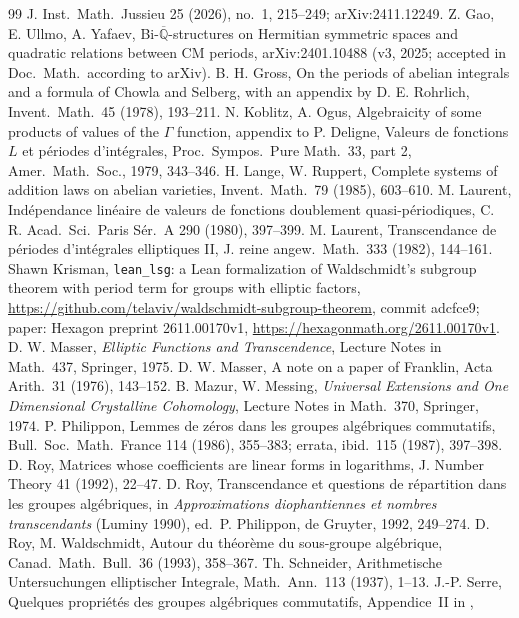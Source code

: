 \documentclass[11pt]{amsart}
\theoremstyle{definition}
\newcommand{\Qb}{\overline{\mathbb{Q}}}
\begin{document}
\begin{thebibliography}{99}
J. Inst.\ Math.\ Jussieu 25 (2026), no.~1, 215--249; arXiv:2411.12249.
 Z. Gao, E. Ullmo, A. Yafaev, Bi-$\Qb$-structures on Hermitian symmetric spaces and quadratic relations
between CM periods, arXiv:2401.10488 (v3, 2025; accepted in Doc.\ Math.\ according to arXiv).
 B. H. Gross, On the periods of abelian integrals and a formula of Chowla and Selberg, with an appendix by
D. E. Rohrlich, Invent.\ Math.\ 45 (1978), 193--211.
 N. Koblitz, A. Ogus, Algebraicity of some products of values of the $\Gamma$ function, appendix to P. Deligne,
Valeurs de fonctions $L$ et p\'eriodes d'int\'egrales, Proc.\ Sympos.\ Pure Math.\ 33, part 2, Amer.\ Math.\ Soc., 1979,
343--346.
 H. Lange, W. Ruppert, Complete systems of addition laws on abelian varieties, Invent.\ Math.\ 79
(1985), 603--610.
 M. Laurent, Ind\'ependance lin\'eaire de valeurs de fonctions doublement quasi-p\'eriodiques, C. R. Acad.\
Sci.\ Paris S\'er.~A 290 (1980), 397--399.
 M. Laurent, Transcendance de p\'eriodes d'int\'egrales elliptiques II, J. reine angew.\ Math.\ 333 (1982),
144--161.
 Shawn Krisman, \texttt{lean\_lsg}: a Lean formalization of Waldschmidt's subgroup theorem with period term for groups with elliptic factors,
\url{https://github.com/telaviv/waldschmidt-subgroup-theorem}, commit adcfce9; paper: Hexagon preprint 2611.00170v1, \url{https://hexagonmath.org/2611.00170v1}.
\bibitem{Ma75} D. W. Masser, \emph{Elliptic Functions and Transcendence}, Lecture Notes in Math.\ 437, Springer, 1975.
\bibitem{Ma76} D. W. Masser, A note on a paper of Franklin, Acta Arith.\ 31 (1976), 143--152.
\bibitem{MM74} B. Mazur, W. Messing, \emph{Universal Extensions and One Dimensional Crystalline Cohomology}, Lecture
Notes in Math.\ 370, Springer, 1974.
 P. Philippon, Lemmes de z\'eros dans les groupes alg\'ebriques commutatifs, Bull.\ Soc.\ Math.\ France 114
(1986), 355--383; errata, ibid.\ 115 (1987), 397--398.
 D. Roy, Matrices whose coefficients are linear forms in logarithms, J. Number Theory 41 (1992), 22--47.
\bibitem{R1} D. Roy, Transcendance et questions de r\'epartition dans les groupes alg\'ebriques, in \emph{Approximations
diophantiennes et nombres transcendants} (Luminy 1990), ed.\ P. Philippon, de Gruyter, 1992, 249--274.
\bibitem{RW93} D. Roy, M. Waldschmidt, Autour du th\'eor\`eme du sous-groupe alg\'ebrique, Canad.\ Math.\ Bull.\ 36
(1993), 358--367.
 Th. Schneider, Arithmetische Untersuchungen elliptischer Integrale, Math.\ Ann.\ 113 (1937), 1--13.
\bibitem{Se79} J.-P. Serre, Quelques propri\'et\'es des groupes alg\'ebriques commutatifs, Appendice~II in \cite{W79},

\end{thebibliography}
\end{document}

